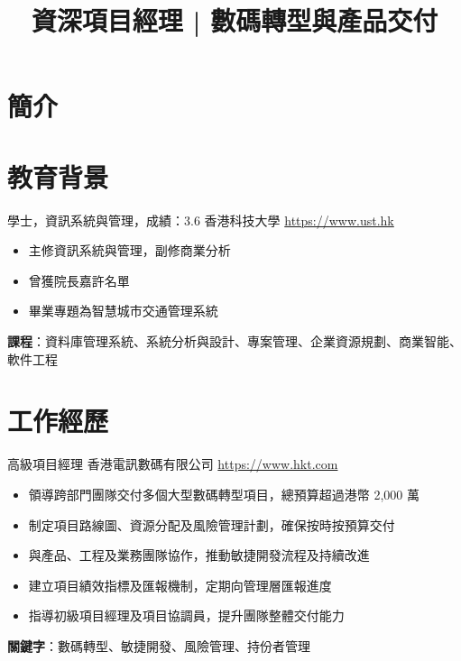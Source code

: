 \documentclass[a4paper, serif, 10pt]{moderncv}
\title{資深項目經理 | 數碼轉型與產品交付}
\begin{document}
\maketitle

\section{簡介}

\section{教育背景}

        {學士，資訊系統與管理，成績：3.6}
        {香港科技大學}
        {\url{https://www.ust.hk}}
        {}
        {\begin{itemize}
\item 主修資訊系統與管理，副修商業分析
\item 曾獲院長嘉許名單
\item 畢業專題為智慧城市交通管理系統
\end{itemize}
\textbf{課程}：資料庫管理系統、系統分析與設計、專案管理、企業資源規劃、商業智能、軟件工程}
\section{工作經歷}

        {高級項目經理}
        {香港電訊數碼有限公司}
        {\url{https://www.hkt.com}}
        {}
        {\begin{itemize}
\item 領導跨部門團隊交付多個大型數碼轉型項目，總預算超過港幣 2,000 萬
\item 制定項目路線圖、資源分配及風險管理計劃，確保按時按預算交付
\item 與產品、工程及業務團隊協作，推動敏捷開發流程及持續改進
\item 建立項目績效指標及匯報機制，定期向管理層匯報進度
\item 指導初級項目經理及項目協調員，提升團隊整體交付能力
\end{itemize}
\textbf{關鍵字}：數碼轉型、敏捷開發、風險管理、持份者管理}
\end{document}
